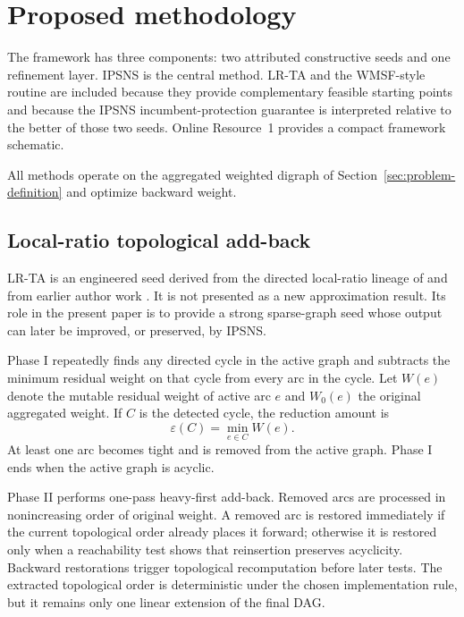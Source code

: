 \section{Proposed methodology}
\label{sec:algorithmic-framework}

The framework has three components: two attributed constructive seeds and one refinement layer. IPSNS is the central method. LR-TA and the WMSF-style routine are included because they provide complementary feasible starting points and because the IPSNS incumbent-protection guarantee is interpreted relative to the better of those two seeds. Online Resource~1 provides a compact framework schematic.

All methods operate on the aggregated weighted digraph of Section~\ref{sec:problem-definition} and optimize backward weight.

\subsection{Local-ratio topological add-back}
\label{subsec:lrta}

LR-TA is an engineered seed derived from the directed local-ratio lineage of \cite{DF03} and from earlier author work \cite{VahidiKoutis2024arxiv}. It is not presented as a new approximation result. Its role in the present paper is to provide a strong sparse-graph seed whose output can later be improved, or preserved, by IPSNS.

Phase I repeatedly finds any directed cycle in the active graph and subtracts the minimum residual weight on that cycle from every arc in the cycle. Let \(W(e)\) denote the mutable residual weight of active arc \(e\) and \(W_0(e)\) the original aggregated weight. If \(C\) is the detected cycle, the reduction amount is
\begin{equation}
    \varepsilon(C)=\min_{e\in C} W(e).
    \label{eq:lrta-epsilon}
\end{equation}
At least one arc becomes tight and is removed from the active graph. Phase I ends when the active graph is acyclic.

Phase II performs one-pass heavy-first add-back. Removed arcs are processed in nonincreasing order of original weight. A removed arc is restored immediately if the current topological order already places it forward; otherwise it is restored only when a reachability test shows that reinsertion preserves acyclicity. Backward restorations trigger topological recomputation before later tests. The extracted topological order is deterministic under the chosen implementation rule, but it remains only one linear extension of the final DAG.

